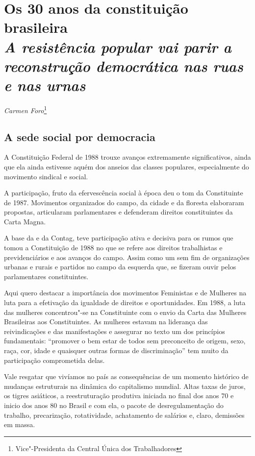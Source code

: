 \chapter*{Os 30 anos da constituição brasileira\\
\emph{A resistência popular vai parir a reconstrução democrática nas
ruas e nas urnas}}


\begin{flushright}
\emph{Carmen Foro}\footnote{Vice"-Presidenta da Central Única dos Trabalhadores}
\end{flushright}

\section{A sede social por democracia}

A Constituição Federal de 1988 trouxe avanços extremamente
significativos, ainda que ela ainda estivesse aquém dos anseios das
classes populares, especialmente do movimento sindical e social.

A participação, fruto da efervescência social à época deu o tom da
Constituinte de 1987. Movimentos organizados do campo, da cidade e da
floresta elaboraram propostas, articularam parlamentares e defenderam
direitos constituintes da Carta Magna.

A base da  e da Contag, teve participação ativa e decisiva para os
rumos que tomou a Constituição de 1988 no que se refere aos direitos
trabalhistas e previdenciários e aos avanços do campo. Assim como um sem
fim de organizações urbanas e rurais e partidos no campo da esquerda
que, se fizeram ouvir pelos parlamentares constituintes.

Aqui quero destacar a importância dos movimentos Feministas e de
Mulheres na luta para a efetivação da igualdade de direitos e
oportunidades. Em 1988, a luta das mulheres concentrou"-se na
Constituinte com o envio da Carta das Mulheres Brasileiras aos
Constituintes. As mulheres estavam na liderança das reivindicações e das
manifestações e assegurar no texto um dos princípios fundamentais:
``promover o bem estar de todos sem preconceito de origem, sexo, raça,
cor, idade e quaisquer outras formas de discriminação'' tem muito da
participação comprometida delas.

Vale resgatar que vivíamos no país as consequências de um momento
histórico de mudanças estruturais na dinâmica do capitalismo mundial.
Altas taxas de juros, os tigres asiáticos, a reestruturação produtiva
iniciada no final dos anos 70 e inicio dos anos 80 no Brasil e com ela,
o pacote de desregulamentação do trabalho, precarização, rotatividade,
achatamento de salários e, claro, demissões em massa.

